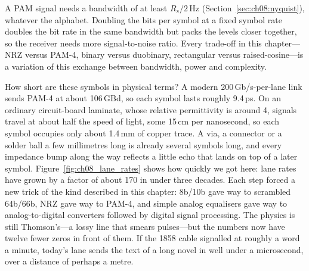 
\begin{keyidea}
A PAM signal needs a bandwidth of at least $R_s/2$\,Hz (Section~\ref{sec:ch08:nyquist}),
whatever the alphabet. Doubling the bits per symbol at a fixed symbol rate doubles the bit
rate in the same bandwidth but packs the levels closer together, so the receiver needs more
signal-to-noise ratio. Every trade-off in this chapter---NRZ versus PAM-4, binary versus
duobinary, rectangular versus raised-cosine---is a variation of this exchange between
bandwidth, power and complexity.
\end{keyidea}


How short are these symbols in physical terms? A modern 200\,Gb/s-per-lane link sends PAM-4
at about 106\,GBd, so each symbol lasts roughly 9.4\,ps. On an ordinary circuit-board
laminate, whose relative permittivity is around 4, signals travel at about half the speed of
light, some 15\,cm per nanosecond, so each symbol occupies only about 1.4\,mm of copper trace.
A via, a connector or a solder ball a few millimetres long is already several symbols long,
and every impedance bump along the way reflects a little echo that lands on top of a later
symbol. Figure~\ref{fig:ch08_lane_rates} shows how quickly we got here: lane rates have grown
by a factor of about 170 in under three decades. Each step forced a new trick of the kind
described in this chapter: 8b/10b gave way to scrambled 64b/66b, NRZ gave way to PAM-4, and
simple analog equalisers gave way to analog-to-digital converters followed by digital signal
processing. The physics is still Thomson's---a lossy line that smears pulses---but the
numbers now have twelve fewer zeros in front of them. If the 1858 cable signalled at roughly a
word a minute, today's lane sends the text of a long novel in well under a microsecond, over a
distance of perhaps a metre.

